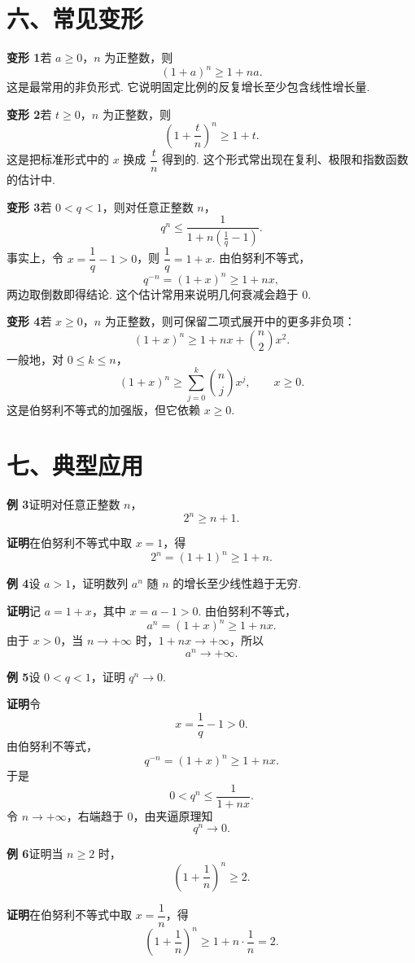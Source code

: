 \documentclass[UTF8, 12pt, fontset=fandol, oneside]{ctexart}
\begin{document}
\section*{六、常见变形}

\noindent\textbf{变形 1}\quad 若 $a\ge0$，$n$ 为正整数，则
\[
  (1+a)^n\ge1+na.
\]
这是最常用的非负形式. 它说明固定比例的反复增长至少包含线性增长量.

\noindent\textbf{变形 2}\quad 若 $t\ge0$，$n$ 为正整数，则
\[
  \left(1+\frac{t}{n}\right)^n\ge1+t.
\]
这是把标准形式中的 $x$ 换成 $\dfrac tn$ 得到的. 这个形式常出现在复利、极限和指数函数的估计中.

\noindent\textbf{变形 3}\quad 若 $0<q<1$，则对任意正整数 $n$，
\[
  q^n\le \frac1{1+n\left(\frac1q-1\right)}.
\]
事实上，令 $x=\dfrac1q-1>0$，则 $\dfrac1q=1+x$. 由伯努利不等式，
\[
  q^{-n}=\left(1+x\right)^n\ge1+nx,
\]
两边取倒数即得结论. 这个估计常用来说明几何衰减会趋于 $0$.

\noindent\textbf{变形 4}\quad 若 $x\ge0$，$n$ 为正整数，则可保留二项式展开中的更多非负项：
\[
  (1+x)^n\ge1+nx+\binom n2x^2.
\]
一般地，对 $0\le k\le n$，
\[
  (1+x)^n\ge \sum_{j=0}^k\binom njx^j,\qquad x\ge0.
\]
这是伯努利不等式的加强版，但它依赖 $x\ge0$.

\section*{七、典型应用}

\noindent\textbf{例 3}\quad 证明对任意正整数 $n$，
\[
  2^n\ge n+1.
\]

\noindent\textbf{证明}\quad 在伯努利不等式中取 $x=1$，得
\[
  2^n=(1+1)^n\ge1+n.
\]

\noindent\textbf{例 4}\quad 设 $a>1$，证明数列 $a^n$ 随 $n$ 的增长至少线性趋于无穷.

\noindent\textbf{证明}\quad 记 $a=1+x$，其中 $x=a-1>0$. 由伯努利不等式，
\[
  a^n=(1+x)^n\ge1+nx.
\]
由于 $x>0$，当 $n\to+\infty$ 时，$1+nx\to+\infty$，所以
\[
  a^n\to+\infty.
\]

\noindent\textbf{例 5}\quad 设 $0<q<1$，证明 $q^n\to0$.

\noindent\textbf{证明}\quad 令
\[
  x=\frac1q-1>0.
\]
由伯努利不等式，
\[
  q^{-n}=\left(1+x\right)^n\ge1+nx.
\]
于是
\[
  0<q^n\le\frac1{1+nx}.
\]
令 $n\to+\infty$，右端趋于 $0$，由夹逼原理知
\[
  q^n\to0.
\]

\noindent\textbf{例 6}\quad 证明当 $n\ge2$ 时，
\[
  \left(1+\frac1n\right)^n\ge2.
\]

\noindent\textbf{证明}\quad 在伯努利不等式中取 $x=\dfrac1n$，得
\[
  \left(1+\frac1n\right)^n\ge1+n\cdot\frac1n=2.
\]
\end{document}
